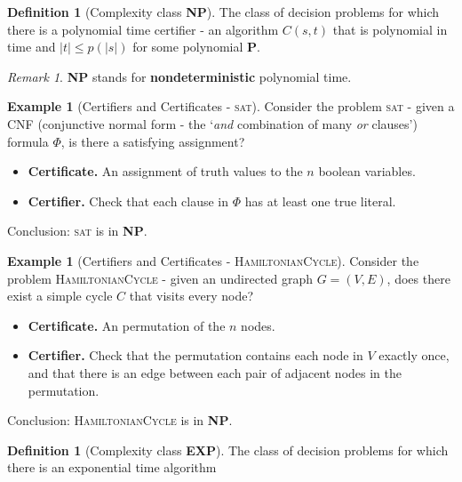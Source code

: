 \documentclass[10pt, oneside, reqno]{amsart}
\theoremstyle{plain}%
\theoremstyle{definition}
\newtheorem{defn}[thm]{Definition}
\newtheorem{exmp}[thm]{Example}
\theoremstyle{remark}
\newtheorem*{rem}{Remark}
\begin{document}
\begin{defn}[Complexity class \textbf{NP}]
    The class of decision problems for which there is a polynomial time certifier - an algorithm $C(s,t)$ that is polynomial in time and $|t| \leq p(|s|)$ for some polynomial \textbf{P}.
\end{defn}

\begin{rem}
    \textbf{NP} stands for \textbf{nondeterministic} polynomial time.
\end{rem}

\begin{exmp}[Certifiers and Certificates - \textsc{sat}]
    Consider the problem \textsc{sat} - given a CNF (conjunctive normal form - the `\emph{and} combination of many \emph{or} clauses') formula $\Phi$, is there a satisfying assignment?
    \begin{itemize}
        \item \textbf{Certificate.} An assignment of truth values to the $n$ boolean variables.
        \item \textbf{Certifier.} Check that each clause in $\Phi$ has at least one true literal.
    \end{itemize}
    
    Conclusion: \textsc{sat} is in \textbf{NP}.
\end{exmp}

\begin{exmp}[Certifiers and Certificates - \textsc{HamiltonianCycle}]
    Consider the problem \textsc{HamiltonianCycle} - given an undirected graph $G = (V,E)$, does there exist a simple cycle $C$ that visits every node?
    \begin{itemize}
        \item \textbf{Certificate.} An permutation of the $n$ nodes.
        \item \textbf{Certifier.} Check that the permutation contains each node in $V$ exactly once, and that there is an edge between each pair of adjacent nodes in the permutation.
    \end{itemize}
    
    
    Conclusion: \textsc{HamiltonianCycle} is in \textbf{NP}.
\end{exmp}


\begin{defn}[Complexity class \textbf{EXP}]
    The class of decision problems for which there is an exponential time algorithm
\end{defn}
\end{document}
